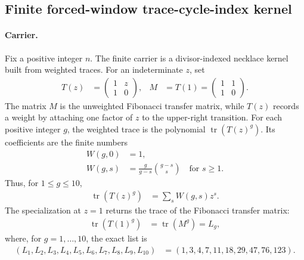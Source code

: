 
\subsection{Finite forced-window trace-cycle-index kernel}
\label{sec:window6-clock-gauge-invariant-trace-cycle-index-necklace-kernel}

\paragraph{Carrier.}
Fix a positive integer $n$. The finite carrier is a divisor-indexed necklace kernel built from weighted traces. For an indeterminate $z$, set
$$
\begin{aligned}
T(z) &= \begin{pmatrix}1 & z \\ 1 & 0\end{pmatrix},
&
M &= T(1)=\begin{pmatrix}1 & 1 \\ 1 & 0\end{pmatrix}.
\end{aligned}
$$
The matrix $M$ is the unweighted Fibonacci transfer matrix, while $T(z)$ records a weight by attaching one factor of $z$ to the upper-right transition. For each positive integer $g$, the weighted trace is the polynomial $\operatorname{tr}(T(z)^g)$. Its coefficients are the finite numbers
$$
\begin{aligned}
W(g,0)&=1,\\
W(g,s)&=\frac{g}{g-s}\binom{g-s}{s}\quad\text{for }s\geq 1.
\end{aligned}
$$
Thus, for $1\leq g\leq 10$,
$$
\begin{aligned}
\operatorname{tr}(T(z)^g)&=\sum_s W(g,s)z^s.
\end{aligned}
$$
The specialization at $z=1$ returns the trace of the Fibonacci transfer matrix:
$$
\begin{aligned}
\operatorname{tr}(T(1)^g)&=\operatorname{tr}(M^g)=L_g,
\end{aligned}
$$
where, for $g=1,\ldots,10$, the exact list is
$$
\begin{aligned}
(L_1,L_2,L_3,L_4,L_5,L_6,L_7,L_8,L_9,L_{10})
&=(1,3,4,7,11,18,29,47,76,123).
\end{aligned}
$$

